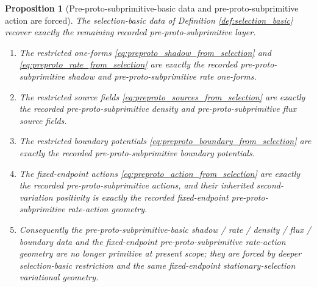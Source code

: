 \documentclass[11pt]{article}
\newtheorem{proposition}{Proposition}
\begin{document}
\begin{proposition}[Pre-proto-subprimitive-basic data and pre-proto-subprimitive action are forced]
\label{prop:preproto_basic_forced}
The selection-basic data of Definition \ref{def:selection_basic} recover exactly the remaining recorded pre-proto-subprimitive layer.
\begin{enumerate}
    \item The restricted one-forms \eqref{eq:preproto_shadow_from_selection} and \eqref{eq:preproto_rate_from_selection} are exactly the recorded pre-proto-subprimitive shadow and pre-proto-subprimitive rate one-forms.
    \item The restricted source fields \eqref{eq:preproto_sources_from_selection} are exactly the recorded pre-proto-subprimitive density and pre-proto-subprimitive flux source fields.
    \item The restricted boundary potentials \eqref{eq:preproto_boundary_from_selection} are exactly the recorded pre-proto-subprimitive boundary potentials.
    \item The fixed-endpoint actions \eqref{eq:preproto_action_from_selection} are exactly the recorded pre-proto-subprimitive actions, and their inherited second-variation positivity is exactly the recorded fixed-endpoint pre-proto-subprimitive rate-action geometry.
    \item Consequently the pre-proto-subprimitive-basic shadow / rate / density / flux / boundary data and the fixed-endpoint pre-proto-subprimitive rate-action geometry are no longer primitive at present scope; they are forced by deeper selection-basic restriction and the same fixed-endpoint stationary-selection variational geometry.
\end{enumerate}
\end{proposition}
\end{document}
